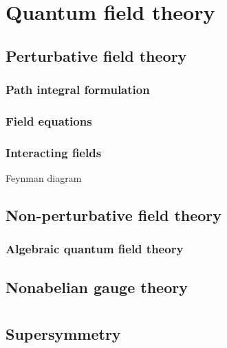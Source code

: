 \documentclass{../note}
\begin{document}
\part{Quantum field theory}
\chapter{Perturbative field theory}
\section{Path integral formulation}
\section{Field equations}
\section{Interacting fields}
Feynman diagram

\chapter{Non-perturbative field theory}
\section{Algebraic quantum field theory}

\chapter{Nonabelian gauge theory}





\part{}
\chapter{Supersymmetry}
\end{document}
